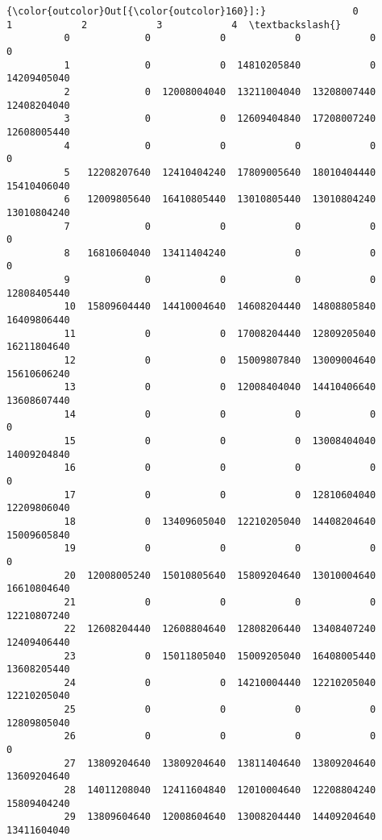\documentclass[11pt]{article}
\begin{document}
\begin{Verbatim}[commandchars=\\\{\}]
{\color{outcolor}Out[{\color{outcolor}160}]:}               0            1            2            3            4  \textbackslash{}
          0             0            0            0            0            0   
          1             0            0  14810205840            0  14209405040   
          2             0  12008004040  13211004040  13208007440  12408204040   
          3             0            0  12609404840  17208007240  12608005440   
          4             0            0            0            0            0   
          5   12208207640  12410404240  17809005640  18010404440  15410406040   
          6   12009805640  16410805440  13010805440  13010804240  13010804240   
          7             0            0            0            0            0   
          8   16810604040  13411404240            0            0            0   
          9             0            0            0            0  12808405440   
          10  15809604440  14410004640  14608204440  14808805840  16409806440   
          11            0            0  17008204440  12809205040  16211804640   
          12            0            0  15009807840  13009004640  15610606240   
          13            0            0  12008404040  14410406640  13608607440   
          14            0            0            0            0            0   
          15            0            0            0  13008404040  14009204840   
          16            0            0            0            0            0   
          17            0            0            0  12810604040  12209806040   
          18            0  13409605040  12210205040  14408204640  15009605840   
          19            0            0            0            0            0   
          20  12008005240  15010805640  15809204640  13010004640  16610804640   
          21            0            0            0            0  12210807240   
          22  12608204440  12608804640  12808206440  13408407240  12409406440   
          23            0  15011805040  15009205040  16408005440  13608205440   
          24            0            0  14210004440  12210205040  12210205040   
          25            0            0            0            0  12809805040   
          26            0            0            0            0            0   
          27  13809204640  13809204640  13811404640  13809204640  13609204640   
          28  14011208040  12411604840  12010004640  12208804240  15809404240   
          29  13809604640  12008604640  13008204440  14409204640  13411604040   

\end{Verbatim}
\end{document}
